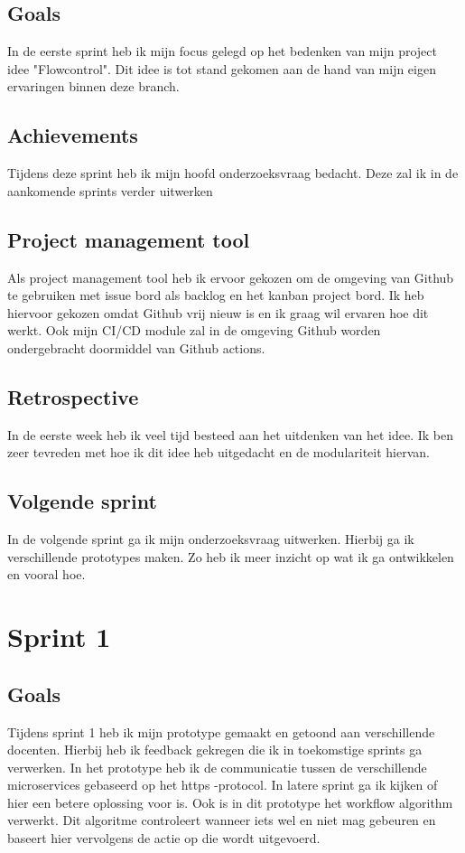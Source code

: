 \documentclass[11pt, twoside]{report}
\begin{document}
    \subsection{Goals}\label{subsec:goals-0}
    In de eerste sprint heb ik mijn focus gelegd op het bedenken van mijn project idee "Flowcontrol".
    Dit idee is tot stand gekomen aan de hand van mijn eigen ervaringen binnen deze branch.

    \subsection{Achievements}\label{subsec:achievements-0}
    Tijdens deze sprint heb ik mijn hoofd onderzoeksvraag bedacht.
    Deze zal ik in de aankomende sprints verder uitwerken

    \subsection{Project management tool}\label{subsec:project-management-tool}
    Als project management tool heb ik ervoor gekozen om de omgeving van Github te gebruiken met issue bord als
    backlog en het kanban project bord.
    Ik heb hiervoor gekozen omdat Github vrij nieuw is en ik graag wil ervaren hoe dit werkt.
    Ook mijn CI/CD module zal in de omgeving Github worden ondergebracht doormiddel van Github actions.

    \subsection{Retrospective}\label{subsec:retrospective-0}
    In de eerste week heb ik veel tijd besteed aan het uitdenken van het idee.
    Ik ben zeer tevreden met hoe ik dit idee heb uitgedacht en de modulariteit hiervan.

    \subsection{Volgende sprint}\label{subsec:volgende-sprint-0}
    In de volgende sprint ga ik mijn onderzoeksvraag uitwerken.
    Hierbij ga ik verschillende prototypes maken.
    Zo heb ik meer inzicht op wat ik ga ontwikkelen en vooral hoe.

    \newpage
    \section{Sprint 1}
    \label{sec:sprint-1}

    \subsection{Goals}\label{subsec:goals=1}
    Tijdens sprint 1 heb ik mijn prototype gemaakt en getoond aan verschillende docenten.
    Hierbij heb ik feedback gekregen die ik in toekomstige sprints ga verwerken.
    In het prototype heb ik de communicatie tussen de verschillende microservices gebaseerd op het https
    -protocol.
    In latere sprint ga ik kijken of hier een betere oplossing voor is.
    Ook is in dit prototype het workflow algorithm verwerkt.
    Dit algoritme controleert wanneer iets wel en niet mag gebeuren en baseert hier vervolgens de actie op die wordt
    uitgevoerd.
\end{document}
